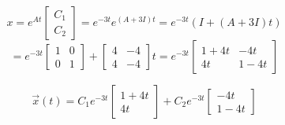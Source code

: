 \documentclass[12pt]{article}
\begin{document}
\begin{enumerate}
    \[x = e^{At} \begin{bmatrix}
        C_1\\
        C_2
    \end{bmatrix} = e^{-3t}e^{(A + 3I)t} = e^{-3t}(I + (A + 3I)t)\]
    \[= e^{-3t} \begin{bmatrix}
        1 & 0\\
        0 & 1
    \end{bmatrix} + \begin{bmatrix}
        4 & -4\\
        4 & -4
    \end{bmatrix}t = e^{-3t} \begin{bmatrix}
        1 + 4t & -4t\\
        4t & 1 - 4t
    \end{bmatrix}\]

    \[\boxed{\vec{x}(t) = C_1 e^{-3t} \begin{bmatrix}
        1 + 4t\\
        4t
    \end{bmatrix} + C_2 e^{-3t} \begin{bmatrix}
        -4t\\
        1 - 4t
    \end{bmatrix}}\]
\end{enumerate}
\end{document}
